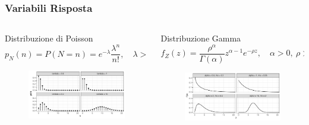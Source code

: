 \documentclass[pdf, aspectratio=169, xcolor=dvipsnames]{beamer}\usepackage[]{graphicx}\usepackage[]{color}
\theoremstyle{definition}
\begin{document}
\begin{frame}
\frametitle{Variabili Risposta}

\fontsize{9pt}{11pt}\selectfont

\begin{columns}[T]

\begin{column}{0.45\linewidth}
  \begin{block}{Distribuzione di Poisson}
    $$
    p_N(n) = P\left( N = n \right) = e^{-\lambda}\frac{\lambda^n}{n!}, \quad \lambda>0
    $$
  
    \begin{figure}
      \centering
      \includegraphics[width=6cm]{_bookdown_files/_main_files/figure-latex/plot-poisson-1.pdf}
      \label{fig:plot-poisson}
    \end{figure}

  \end{block}
\end{column}

\begin{column}{0.45\linewidth}
  \begin{block}{Distribuzione Gamma}
    $$
    f_Z(z) = \frac{\rho^\alpha}{\Gamma(\alpha)}z^{\alpha-1}e^{-\rho z}, \quad \alpha > 0, \ \rho > 0
    $$
    
    \begin{figure}
      \centering
      \includegraphics[width=6cm]{_bookdown_files/_main_files/figure-latex/plot-gamma-1.pdf}
      \label{fig:plot-gamma}
    \end{figure}

  \end{block}
\end{column}

\end{columns}

\end{frame}
\end{document}
